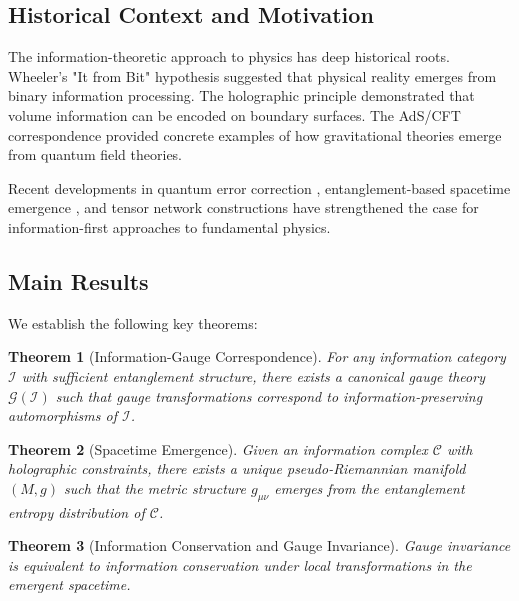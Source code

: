 \documentclass{article}
\newtheorem{theorem}{Theorem}[section]
\begin{document}
\subsection{Historical Context and Motivation}

The information-theoretic approach to physics has deep historical roots. Wheeler's "It from Bit" hypothesis \cite{Wheeler1989} suggested that physical reality emerges from binary information processing. The holographic principle \cite{Susskind1995,Hooft1993} demonstrated that volume information can be encoded on boundary surfaces. The AdS/CFT correspondence \cite{Maldacena1998} provided concrete examples of how gravitational theories emerge from quantum field theories.

Recent developments in quantum error correction \cite{Almheiri2015}, entanglement-based spacetime emergence \cite{VanRaamsdonk2010}, and tensor network constructions \cite{Swingle2012} have strengthened the case for information-first approaches to fundamental physics.

\subsection{Main Results}

We establish the following key theorems:

\begin{theorem}[Information-Gauge Correspondence]
\label{thm:info_gauge}
For any information category $\mathcal{I}$ with sufficient entanglement structure, there exists a canonical gauge theory $\mathcal{G}(\mathcal{I})$ such that gauge transformations correspond to information-preserving automorphisms of $\mathcal{I}$.
\end{theorem}

\begin{theorem}[Spacetime Emergence]
\label{thm:spacetime_emergence}
Given an information complex $\mathcal{C}$ with holographic constraints, there exists a unique pseudo-Riemannian manifold $(M, g)$ such that the metric structure $g_{\mu\nu}$ emerges from the entanglement entropy distribution of $\mathcal{C}$.
\end{theorem}

\begin{theorem}[Information Conservation and Gauge Invariance]
\label{thm:info_conservation}
Gauge invariance is equivalent to information conservation under local transformations in the emergent spacetime.
\end{theorem}
\end{document}
